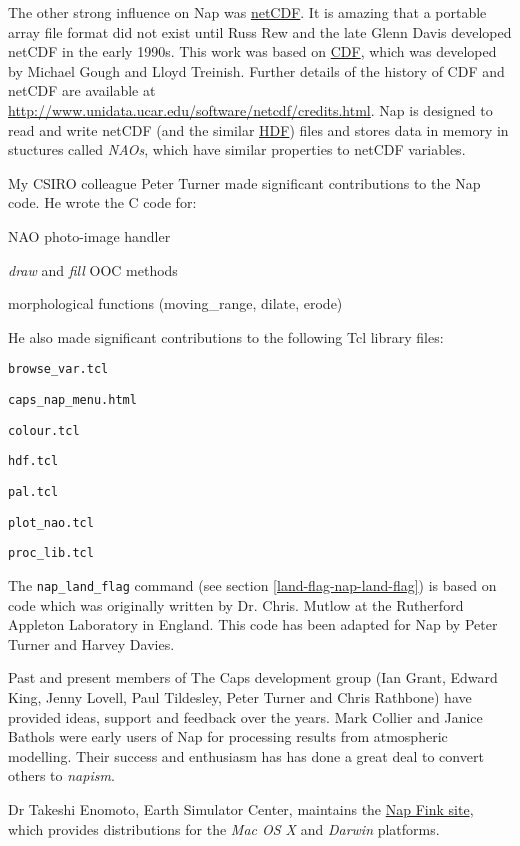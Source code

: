 The other strong influence on Nap was 
  \href{http://www.unidata.ucar.edu/packages/netcdf/index.html}{netCDF}.
  It is amazing that a portable array file format did not exist until
  Russ Rew and the late Glenn Davis developed netCDF in the early
  1990s. This work was based on 
  \href{http://nssdc.gsfc.nasa.gov/cdf/cdf-home.html}{CDF}, which
  was developed by Michael Gough and Lloyd Treinish. 
Further details of the history of CDF and netCDF are available at
\\
\href{http://www.unidata.ucar.edu/software/netcdf/credits.html}
{http://www.unidata.ucar.edu/software/netcdf/credits.html}.
Nap is designed to
  read and write netCDF (and the similar 
  \href{http://www.hdfgroup.org/}{HDF}) files and stores data in
  memory in stuctures called 
  \textit{NAOs}, which have similar properties to netCDF variables.
  \par
    My CSIRO colleague Peter Turner made significant
  contributions to the Nap code. He wrote the C code for:
\begin{bullets}
    \item NAO photo-image handler
    \item 
    \textit{draw} and 
    \textit{fill} OOC methods
    \item morphological functions (moving\_range, dilate, erode)
\end{bullets}
He also made significant contributions to the following Tcl
  library files:
\begin{bullets}
    \item 
      \texttt{browse\_var.tcl}
    \item 
      \texttt{caps\_nap\_menu.html}
    \item 
      \texttt{colour.tcl}
    \item 
      \texttt{hdf.tcl}
    \item 
      \texttt{pal.tcl}
    \item 
      \texttt{plot\_nao.tcl}
    \item 
      \texttt{proc\_lib.tcl}
\end{bullets}

The \texttt{nap\_land\_flag} command 
(see section \ref{land-flag-nap-land-flag})
is based on code which was originally written by Dr.
  Chris. Mutlow at the Rutherford Appleton Laboratory in England. This
  code has been adapted for Nap by Peter Turner and Harvey Davies.
  \par Past and present members of The Caps development group (Ian Grant,
  Edward King, Jenny Lovell, Paul Tildesley, Peter Turner and Chris
  Rathbone) have provided ideas, support and feedback over the years.
  Mark Collier and Janice Bathols were early users of Nap for
  processing results from atmospheric modelling. Their success and
  enthusiasm has has done a great deal to convert others to 
  \textit{napism}. 
  \par Dr Takeshi Enomoto, Earth Simulator Center, maintains the 
  \href{http://fink.sourceforge.net/pdb/package.php/nap}{Nap Fink site}, which provides distributions for the 
  \textit{Mac OS X} and 
  \textit{Darwin} platforms.
